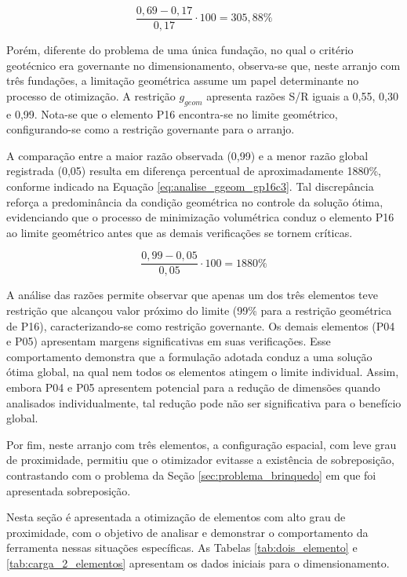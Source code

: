 \begin{equation}
    \label{eq:analise_gsc3_gsc2}
    \frac{0,69-0,17}{0,17}\cdot100= 305,88\%
\end{equation}

Porém, diferente do problema de uma única fundação, no qual o critério geotécnico era governante no dimensionamento, observa-se que, neste arranjo com três fundações, a limitação geométrica assume um papel determinante no processo de otimização. A restrição $g_{geom}$ apresenta razões S/R iguais a 0,55, 0,30 e 0,99. Nota-se que o elemento P16 encontra-se no limite geométrico, configurando-se como a restrição governante para o arranjo.

A comparação entre a maior razão observada (0,99) e a menor razão global registrada (0,05) resulta em diferença percentual de aproximadamente 1880\%, conforme indicado na Equação \eqref{eq:analise_ggeom_gp16c3}. Tal discrepância reforça a predominância da condição geométrica no controle da solução ótima, evidenciando que o processo de minimização volumétrica conduz o elemento P16 ao limite geométrico antes que as demais verificações se tornem críticas.

\begin{equation}
    \label{eq:analise_ggeom_gp16c3}
    \frac{0,99-0,05}{0,05}\cdot100= 1880\%
\end{equation}

A análise das razões permite observar que apenas um dos três elementos teve restrição que alcançou valor próximo do limite (99\% para a restrição geométrica de P16), caracterizando-se como restrição governante. Os demais elementos (P04 e P05) apresentam margens significativas em suas verificações. Esse comportamento  demonstra que a formulação adotada conduz a uma solução ótima global, na qual nem todos os elementos atingem o limite individual. Assim, embora P04 e P05 apresentem potencial para a redução de dimensões quando analisados individualmente, tal redução pode não ser significativa para o benefício global. 

Por fim, neste arranjo com três elementos, a configuração espacial, com leve grau de proximidade, permitiu que o otimizador evitasse a existência de sobreposição, contrastando com o problema da Seção \ref{sec:problema_brinquedo} em que foi apresentada sobreposição.

\label{item:elemento_sobreoposto}

Nesta seção é apresentada a otimização de elementos com alto grau de proximidade, com o objetivo de analisar e demonstrar o comportamento da ferramenta nessas situações específicas. As Tabelas \ref{tab:dois_elemento} e \ref{tab:carga_2_elementos} apresentam os dados iniciais para o dimensionamento.

